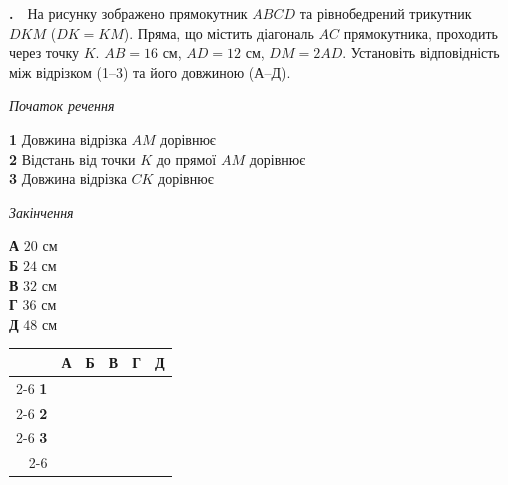 \documentclass[12pt]{article}
\newcommand{\matchingGrid}{%
    \begingroup
    \renewcommand{\arraystretch}{1.15}
    \setlength{\tabcolsep}{4pt}
    \footnotesize
    \begin{tabular}{r|c|c|c|c|c|}
         \multicolumn{1}{c}{} & \multicolumn{1}{c}{\textbf{А}} & \multicolumn{1}{c}{\textbf{Б}} & \multicolumn{1}{c}{\textbf{В}} & \multicolumn{1}{c}{\textbf{Г}} & \multicolumn{1}{c}{\textbf{Д}} \\ \cline{2-6}
         \textbf{1} & \phantom{X} & \phantom{X} & \phantom{X} & \phantom{X} & \phantom{X} \\ \cline{2-6}
         \textbf{2} & & & & & \\ \cline{2-6}
         \textbf{3} & & & & & \\ \cline{2-6}
    \end{tabular}
    \endgroup
}
\newcounter{zad}
\newcommand{\zadnum}{\stepcounter{zad}\textbf{\thezad.}\ \ }
\begin{document}
\zadnum На рисунку зображено прямокутник $ABCD$ та рівнобедрений трикутник $DKM$ ($DK = KM$). Пряма, що містить діагональ $AC$ прямокутника, проходить через точку $K$. $AB = 16$ см, $AD = 12$ см, $DM = 2AD$. Установіть відповідність між відрізком (1--3) та його довжиною (А--Д).

\vspace{0.3cm}
\begin{center}
\end{center}

\vspace{0.2cm}
\noindent
\begin{minipage}[t]{0.46\textwidth}
\textit{Початок речення}\par\vspace{0.2cm}
\textbf{1} \quad Довжина відрізка $AM$ дорівнює\\[0.2cm]
\textbf{2} \quad Відстань від точки $K$ до прямої $AM$ дорівнює\\[0.2cm]
\textbf{3} \quad Довжина відрізка $CK$ дорівнює
\end{minipage}
\hfill
\begin{minipage}[t]{0.28\textwidth}
\textit{Закінчення}\par\vspace{0.2cm}
\textbf{А} \quad $20$ см\\[0.15cm]
\textbf{Б} \quad $24$ см\\[0.15cm]
\textbf{В} \quad $32$ см\\[0.15cm]
\textbf{Г} \quad $36$ см\\[0.15cm]
\textbf{Д} \quad $48$ см
\end{minipage}
\hfill
\begin{minipage}[t]{0.2\textwidth}
\vspace{0.5cm}
\begin{flushright}\matchingGrid\end{flushright}
\end{minipage}
\end{document}
